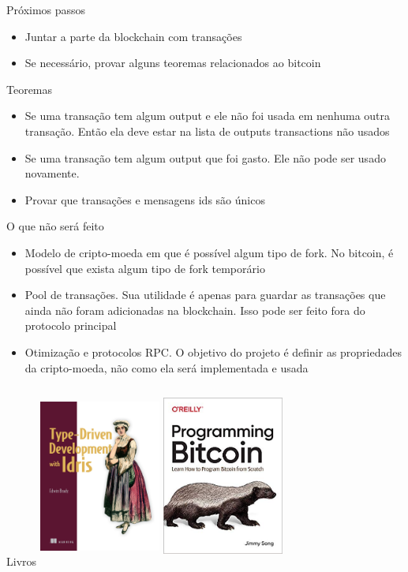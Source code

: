 \documentclass{beamer}
\begin{document}
  \begin{frame}{Próximos passos}
    \begin{itemize}
        \item Juntar a parte da blockchain com transações
        \item Se necessário, provar alguns teoremas relacionados ao bitcoin
    \end{itemize}
  \end{frame}
  
  \begin{frame}{Teoremas}
    \begin{itemize}
        \item Se uma transação tem algum output e ele não foi usada em nenhuma outra transação. Então ela deve estar na lista de outputs transactions não usados
        \item Se uma transação tem algum output que foi gasto. Ele não pode ser usado novamente.
        \item Provar que transações e mensagens ids são únicos
    \end{itemize}
  \end{frame}
  
  \begin{frame}{O que não será feito}
    \begin{itemize}
      \item Modelo de cripto-moeda em que é possível algum tipo de fork. No bitcoin, é possível que exista algum tipo de fork temporário
      \item Pool de transações. Sua utilidade é apenas para guardar as transações que ainda não foram adicionadas na blockchain. 
      Isso pode ser feito fora do protocolo principal
      \item Otimização e protocolos RPC. O objetivo do projeto é definir as propriedades da cripto-moeda, não como ela será implementada e usada
    \end{itemize}
  \end{frame}

 \begin{frame}{Livros}
    \includegraphics[width=4cm, height=6cm]{TDD}
    \includegraphics[width=4cm, height=6cm]{ProgrammingBitcoin}
 \end{frame}
  
\end{document}
